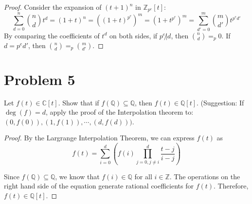 \documentclass{article}
\begin{document}
\begin{proof}
    Consider the expansion of $(t + 1)^n$ in $\mathbb{Z}_{p^e}[t]$:
    \begin{equation*}
       \sum_{d=0}^{n}\binom{n}{d}t^d = (1 + t)^n = \left((1 + t)^{p^e}\right)^m = (1 + t^{p^e})^m = \sum_{d'=0}^{m}\binom{m}{d'}t^{p^{e}d'}
    \end{equation*}
    By comparing the coefficients of $t^d$ on both sides, if $p^e \not | d$, then $\binom{n}{d} =_p 0$. If $d = p^ed'$, then $\binom{n}{d} =_p \binom{m}{d'}$.
\end{proof}


\section{Problem 5}
Let $f(t)\in \mathbb{C}[t]$. Show that if $f(\mathbb{Q})\subseteq \mathbb{Q}$, then $f(t)\in \mathbb{Q}[t]$.
(Suggestion: If $\deg(f)  =  d$, apply the proof of the Interpolation theorem to: 
$(0, f(0)), (1, f(1)), \cdots , (d, f(d)))$.

\begin{proof}
    By the Largrange Interpolation Theorem, we can express $f(t)$ as
    \begin{equation*}
        f(t) = \sum_{i=0}^{d}\left( f(i) \prod_{j=0, j\neq i}^{d} \frac{t - j}{i - j}\right)
    \end{equation*}

    Since $f(\mathbb{Q})\subseteq \mathbb{Q}$, we know that $f(i)\in\mathbb{Q}$ for all $i\in\mathbb{Z}$. 
    The operations on the right hand side of the equation generate rational coefficients for $f(t)$.
    Therefore, $f(t)\in\mathbb{Q}[t]$.
\end{proof}
\end{document}
